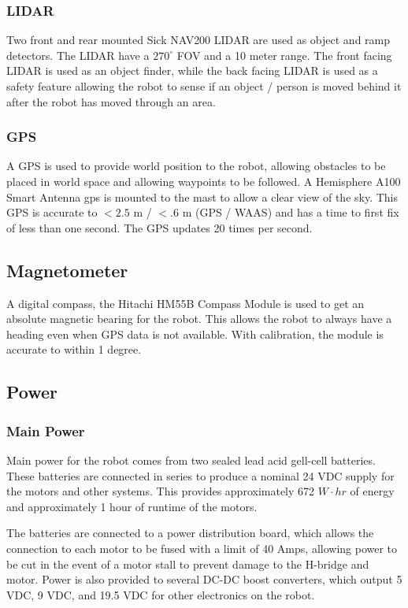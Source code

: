 \subsubsection{LIDAR}

Two front and rear mounted Sick NAV200 LIDAR are used as object and ramp detectors. The LIDAR have a $270^{\circ}$ FOV and a 10 meter range. The front facing LIDAR is used as an object finder, while the back facing LIDAR is used as a safety feature allowing the robot to sense if an object / person is moved behind it after the robot has moved through an area.

\subsubsection{GPS}

A GPS is used to provide world position to the robot, allowing obstacles to be placed in world space and allowing waypoints to be followed. A Hemisphere A100 Smart Antenna gps is mounted to the mast to allow a clear view of the sky. This GPS is accurate to $<2.5$ m / $<.6$ m (GPS / WAAS) and has a time to first fix of less than one second. The GPS updates 20 times per second.

\subsection{Magnetometer}

A digital compass, the Hitachi HM55B Compass Module is used to get an absolute magnetic bearing for the robot. This allows the robot to always have a heading even when GPS data is not available. With calibration, the module is accurate to within 1 degree. 


\subsection{Power}

\subsubsection{Main Power}

Main power for the robot comes from two sealed lead acid gell-cell batteries. These batteries are connected in series to produce a nominal 24 VDC supply for the motors and other systems. This provides approximately 672 $W \cdot hr$ of energy and approximately 1 hour of runtime of the motors.

The batteries are connected to a power distribution board, which allows the connection to each motor to be fused with a limit of 40 Amps, allowing power to be cut in the event of a motor stall to prevent damage to the H-bridge and motor. Power is also provided to several DC-DC boost converters, which output 5 VDC, 9 VDC, and 19.5 VDC for other electronics on the robot.


